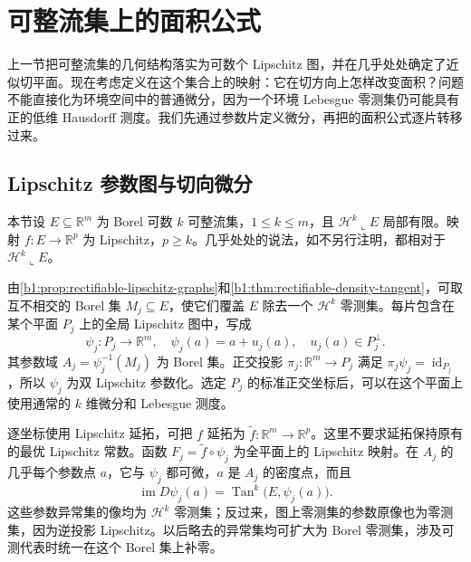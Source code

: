 \section{可整流集上的面积公式}
\label{b1:sec:1903}

上一节把可整流集的几何结构落实为可数个 Lipschitz 图，并在几乎处处确定了近似切平面。现在考虑定义在这个集合上的映射：它在切方向上怎样改变面积？问题不能直接化为环境空间中的普通微分，因为一个环境 Lebesgue 零测集仍可能具有正的低维 Hausdorff 测度。我们先通过参数片定义微分，再把的面积公式逐片转移过来。


\subsection{Lipschitz 参数图与切向微分}
\label{b1:subsec:190301}

本节设 \(E\subseteq\mathbb R^m\) 为 Borel 可数 \(k\) 可整流集，\(1\leq k\leq m\)，且 \(\mathcal H^k\llcorner E\) 局部有限。映射 \(f:E\rightarrow\mathbb R^p\) 为 Lipschitz，\(p\geq k\)。几乎处处的说法，如不另行注明，都相对于 \(\mathcal H^k\llcorner E\)。

\ProseParagraphBreak

由\cref{b1:prop:rectifiable-lipschitz-graphs}和\cref{b1:thm:rectifiable-density-tangent}，可取互不相交的 Borel 集 \(M_j\subseteq E\)，使它们覆盖 \(E\) 除去一个 \(\mathcal H^k\) 零测集。每片包含在某个平面 \(P_j\) 上的全局 Lipschitz 图中，写成
\[
 \psi_j:P_j\longrightarrow\mathbb R^m,\quad
 \psi_j(a)=a+u_j(a),\quad u_j(a)\in P_j^\perp.
\]
其参数域 \(A_j=\psi_j^{-1}(M_j)\) 为 Borel 集。正交投影 \(\pi_j:\mathbb R^m\rightarrow P_j\) 满足 \(\pi_j\psi_j=\operatorname{id}_{P_j}\)，所以 \(\psi_j\) 为双 Lipschitz 参数化。选定 \(P_j\) 的标准正交坐标后，可以在这个平面上使用通常的 \(k\) 维微分和 Lebesgue 测度。

\ProseParagraphBreak

逐坐标使用 Lipschitz 延拓，可把 \(f\) 延拓为 \(\widetilde f:\mathbb R^m\rightarrow\mathbb R^p\)。这里不要求延拓保持原有的最优 Lipschitz 常数。函数 \(F_j=\widetilde f\circ\psi_j\) 为全平面上的 Lipschitz 映射。在 \(A_j\) 的几乎每个参数点 \(a\)，它与 \(\psi_j\) 都可微，\(a\) 是 \(A_j\) 的密度点，而且
\[
 \operatorname{im}D\psi_j(a)
 =\operatorname{Tan}^k\bigl(E,\psi_j(a)\bigr).
\]
这些参数异常集的像均为 \(\mathcal H^k\) 零测集；反过来，图上零测集的参数原像也为零测集，因为逆投影 Lipschitz。以后略去的异常集均可扩大为 Borel 零测集，涉及可测代表时统一在这个 Borel 集上补零。

